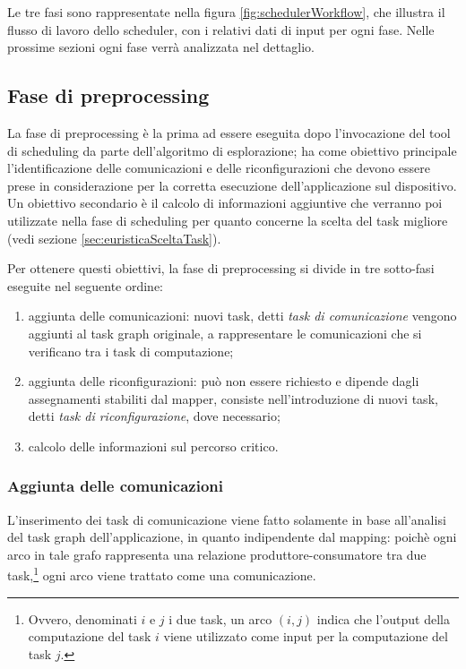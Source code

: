 Le tre fasi sono rappresentate nella figura \ref{fig:schedulerWorkflow}, che 
illustra il flusso di lavoro dello scheduler, con i relativi dati di input per 
ogni fase. Nelle prossime sezioni ogni fase verrà analizzata nel dettaglio.


\subsection{Fase di preprocessing}
\label{subsec:fasePreprocessing}
La fase di preprocessing è la prima ad essere eseguita dopo l'invocazione del 
tool di scheduling da parte dell'algoritmo di esplorazione; ha come obiettivo 
principale l'identificazione delle comunicazioni e delle riconfigurazioni che 
devono essere prese in considerazione per la corretta esecuzione 
dell'applicazione sul dispositivo. Un obiettivo secondario è il calcolo di 
informazioni aggiuntive che verranno poi utilizzate nella fase di scheduling 
per quanto concerne la scelta del task migliore (vedi sezione 
\ref{sec:euristicaSceltaTask}).

Per ottenere questi obiettivi, la fase di preprocessing si divide in tre 
sotto-fasi eseguite nel seguente ordine:
\begin{enumerate}
 \item aggiunta delle comunicazioni: nuovi task, detti \emph{task di 
comunicazione} vengono aggiunti al task graph originale, a rappresentare le 
comunicazioni che si verificano tra i task di computazione;
 \item aggiunta delle riconfigurazioni: può non essere richiesto e dipende 
dagli assegnamenti stabiliti dal mapper, consiste nell'introduzione di nuovi 
task, detti \emph{task di riconfigurazione}, dove necessario;
 \item calcolo delle informazioni sul percorso critico.
\end{enumerate}

\subsubsection{Aggiunta delle comunicazioni}
L'inserimento dei task di comunicazione viene fatto solamente in base 
all'analisi del task graph dell'applicazione, in quanto indipendente dal 
mapping: poichè ogni arco in tale grafo rappresenta una relazione 
produttore-consumatore tra due task,\footnote{Ovvero, denominati $i$ e $j$ i due 
task, un arco $(i,j)$ indica che l'output della computazione del task $i$ viene 
utilizzato come input per la computazione del task $j$.} ogni arco viene 
trattato come una comunicazione.

